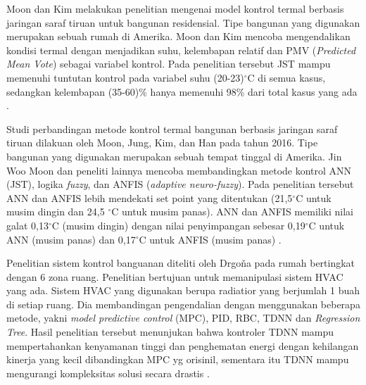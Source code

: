 Moon dan Kim melakukan penelitian mengenai model kontrol termal berbasis jaringan saraf tiruan untuk bangunan residensial. Tipe bangunan yang digunakan merupakan sebuah rumah di Amerika. Moon dan Kim mencoba mengendalikan kondisi termal dengan menjadikan suhu, kelembapan relatif dan PMV (\textit{Predicted Mean Vote}) sebagai variabel kontrol. Pada penelitian tersebut JST mampu memenuhi tuntutan kontrol pada variabel suhu (20-23)$^\circ$C di semua kasus, sedangkan kelembapan (35-60)\% hanya memenuhi 98\% dari total kasus yang ada \cite{paper22JJkim}.

Studi perbandingan metode kontrol termal bangunan berbasis jaringan saraf tiruan dilakuan oleh Moon, Jung, Kim, dan Han pada tahun 2016. Tipe bangunan yang digunakan merupakan sebuah tempat tinggal di Amerika. Jin Woo Moon dan peneliti lainnya mencoba membandingkan metode kontrol ANN (JST), logika \textit{fuzzy}, dan ANFIS (\textit{adaptive neuro-fuzzy}). Pada penelitian tersebut ANN dan ANFIS lebih mendekati set point yang ditentukan (21,5$^{\circ}$C untuk musim dingin dan 24,5 $^{\circ}$C untuk musim panas). ANN dan ANFIS memiliki nilai galat 0,13$^{\circ}$C (musim dingin) dengan nilai penyimpangan sebesar 0,19$^{\circ}$C untuk ANN (musim panas) dan 0,17$^{\circ}$C untuk ANFIS (musim panas) \cite{paper22SKJung}.


Penelitian sistem kontrol banguanan diteliti oleh Drgoňa pada rumah bertingkat dengan 6 zona ruang. Penelitian bertujuan untuk memanipulasi sistem HVAC yang ada. Sistem HVAC yang digunakan berupa radiatior yang berjumlah 1 buah di setiap ruang. Dia membandingan pengendalian dengan menggunakan beberapa metode, yakni \textit{model predictive control} (MPC), PID, RBC, TDNN dan \textit{Regression Tree}. Hasil penelitian tersebut menunjukan bahwa kontroler TDNN mampu mempertahankan kenyamanan tinggi dan penghematan energi dengan kehilangan kinerja yang kecil dibandingkan MPC yg orisinil, sementara itu TDNN mampu mengurangi kompleksitas solusi secara drastis \cite{paper22JanDrgona}.

